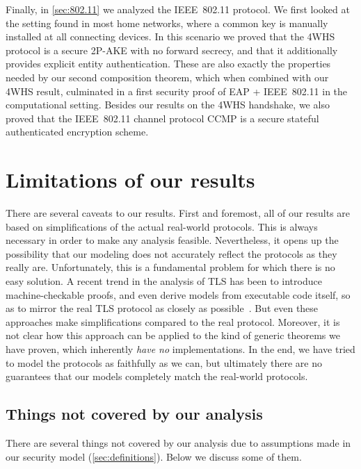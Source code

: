 Finally,
in \cref{sec:802.11} we analyzed the IEEE~802.11 protocol.
We first looked at the setting found in most home networks,
where a common key is manually installed at all connecting devices.
In this scenario we proved that the 4WHS protocol is a secure 2P-AKE with no forward secrecy,
and that it additionally provides explicit entity authentication.
These are also exactly the properties needed by our second composition theorem,
which when combined with our 4WHS result,
culminated in a first security proof of EAP + IEEE~802.11 in the computational setting.
Besides our results on the 4WHS handshake,
we also proved that the IEEE~802.11 channel protocol CCMP is a secure stateful authenticated encryption scheme.



\section{Limitations of our results }

There are several caveats to our results.
First and foremost,
all of our results are based on simplifications of the actual real-world protocols.
This is always necessary in order to make any analysis feasible.
Nevertheless,
it opens up the possibility that our modeling does not accurately reflect the protocols as they really are.
Unfortunately,
this is a fundamental problem for which there is no easy solution.
A recent trend in the analysis of TLS has been to introduce machine-checkable proofs,
and even derive models from executable code itself,
so as to mirror the real TLS protocol as closely as possible~\cite{C:BFKPSZ14,SP:BBDFKP15}.
But even these approaches make simplifications compared to the real protocol.
Moreover,
it is not clear how this approach can be applied to the kind of generic theorems we have proven,
which inherently \emph{have no} implementations.
In the end,
we have tried to model the protocols as faithfully as we can,
but ultimately there are no guarantees that our models completely match the real-world protocols.


\subsection{Things not covered by our analysis}\label{sec:conclusions:things_not_covered}
There are several things  not covered by our analysis due to assumptions made in our security model (\cref{sec:definitions}).
Below we discuss some of them.

